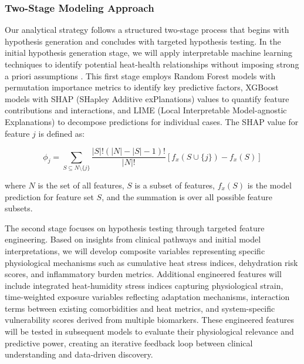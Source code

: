 \subsubsection{Two-Stage Modeling Approach}
Our analytical strategy follows a structured two-stage process that begins with hypothesis generation and concludes with targeted hypothesis testing. In the initial hypothesis generation stage, we will apply interpretable machine learning techniques to identify potential heat-health relationships without imposing strong a priori assumptions \citep{Schwartz2022}. This first stage employs Random Forest models with permutation importance metrics to identify key predictive factors, XGBoost models with SHAP (SHapley Additive exPlanations) values to quantify feature contributions and interactions, and LIME (Local Interpretable Model-agnostic Explanations) to decompose predictions for individual cases. The SHAP value for feature $j$ is defined as:

\begin{equation}
\phi_j = \sum_{S \subseteq N \setminus \{j\}} \frac{|S|!(|N|-|S|-1)!}{|N|!}[f_x(S \cup \{j\}) - f_x(S)]
\end{equation}

\noindent where $N$ is the set of all features, $S$ is a subset of features, $f_x(S)$ is the model prediction for feature set $S$, and the summation is over all possible feature subsets.

The second stage focuses on hypothesis testing through targeted feature engineering. Based on insights from clinical pathways and initial model interpretations, we will develop composite variables representing specific physiological mechanisms such as cumulative heat stress indices, dehydration risk scores, and inflammatory burden metrics. Additional engineered features will include integrated heat-humidity stress indices capturing physiological strain, time-weighted exposure variables reflecting adaptation mechanisms, interaction terms between existing comorbidities and heat metrics, and system-specific vulnerability scores derived from multiple biomarkers. These engineered features will be tested in subsequent models to evaluate their physiological relevance and predictive power, creating an iterative feedback loop between clinical understanding and data-driven discovery.

